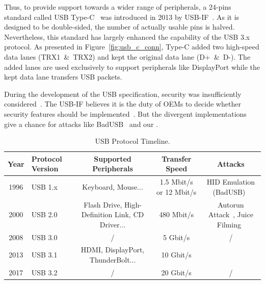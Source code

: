 Thus, to provide support towards a wider range of peripherals, a 24-pins
standard called \ac{USB} Type-C~\cite{typec} was introduced in 2013 by \ac{USB}-IF~\cite{usbif}. As it is designed to be double-sided, the number of actually usable
pins is halved. Nevertheless, this standard has largely enhanced the capability
of the \ac{USB} 3.x protocol. As presented in Figure~\ref{fig:usb_c_conn}, Type-C added
two high-speed data lanes \mbox{(TRX1 \& TRX2)} and kept the original data lane \mbox{(D+ \&
D-)}. The added lanes are used exclusively to support peripherals like
DisplayPort while the kept data lane transfers \ac{USB} packets.

During the development of the \ac{USB} specification, security was insufficiently considered~\cite{sok}. 
The \ac{USB}-IF believes it is the duty of \acp{OEM}
to decide whether security features should be implemented~\cite{usbsec}. But the divergent implementations give a chance for attacks like
BadUSB~\cite{rubber} and our \tool.

\begin{table}
\begin{tabular}{|c|l|c|c|c|}
	\hline
	\textbf{Year} & \textbf{Protocol Version} & \textbf{Supported Peripherals} & \textbf{Transfer Speed} & \textbf{Attacks} \\
	\hline
	1996 & \ac{USB} 1.x~\cite{usb10,usb11} & Keyboard, Mouse... & 1.5 Mbit/s or 12 Mbit/s & \ac{HID} Emulation (BadUSB)~\cite{badusb} \\
	\hline
	2000 & \ac{USB} 2.0~\cite{usb20} & Flash Drive, High-Definition Link, CD Driver... & 480 Mbit/s & Autorun Attack~\cite{duqu}, Juice Filming~\cite{JFC,JFCImpact} \\
	\hline
	2008 & \ac{USB} 3.0~\cite{usb30} & / & 5 Gbit/s & / \\
	\hline
	2013 & \ac{USB} 3.1~\cite{usb31} & HDMI, DisplayPort, ThunderBolt... & 10 Gbit/s & \tool \\
	\hline
	2017 & \ac{USB} 3.2~\cite{usb32} & / & 20 Gbit/s & / \\
	\hline
\end{tabular}
	\linebreak
\caption{\ac{USB} Protocol Timeline.}
\label{table:usb_timeline}
\end{table}
